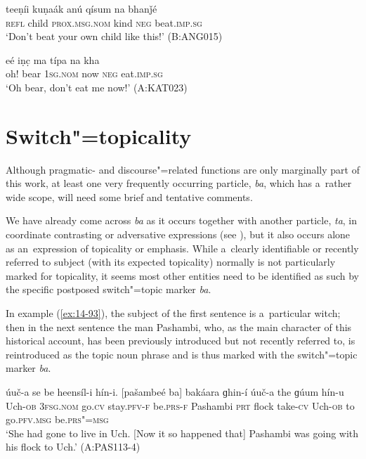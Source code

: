 \begin{exe}
\ex
\label{ex:14-91}
\gll teeṇíi kuṇaák anú qísum na bhanǰé \\
\textsc{refl} child \textsc{prox.msg.nom} kind \textsc{neg} beat.\textsc{imp.sg}  \\
\glt `Don't beat your own child like this!' (B:ANG015)

\ex
\label{ex:14-92}
\gll eé iṇc̣ ma típa na kha \\
oh! bear \textsc{1sg.nom} now \textsc{neg} eat.\textsc{imp.sg } \\
\glt `Oh bear, don't eat me now!' (A:KAT023)
\end{exe}

\section{Switch"=topicality}
\label{sec:14-4}


Although pragmatic- and discourse"=related functions are only marginally part of this work, at least one very frequently occurring particle, \textit{ba}, which has a~rather wide scope, will need some brief and tentative comments.



We have already come across \textit{ba} as it occurs together with another particle, \textit{ta}, in coordinate contrasting or adversative expressions (see ), but it also occurs alone as an~expression of topicality or emphasis. While a~clearly identifiable or recently referred to subject (with its expected topicality) normally is not particularly marked for topicality, it seems most other entities need to be identified as such by the specific postposed switch"=topic \citep[149]{andrews2007} marker \textit{ba}.



In example (\ref{ex:14-93}), the subject of the first sentence is a~particular witch; then in the next sentence the man Pashambi, who, as the main character of this historical account, has been previously introduced but not recently referred to, is reintroduced as the topic noun phrase and is thus marked with the switch"=topic marker \textit{ba}.

\begin{exe}
\ex
\label{ex:14-93}
\gll úuč-a se  be heensíl-i  hín-i. [pašambeé ba] bakáara ɡhin-í úuč-a the ɡúum hín-u \\
Uch-\textsc{ob} \textsc{3fsg.nom} go.\textsc{cv} stay.\textsc{pfv-f} be.\textsc{prs-f} Pashambi  \textsc{prt} flock take-\textsc{cv} Uch-\textsc{ob} to go.\textsc{pfv.msg} be.\textsc{prs"=msg} \\
\glt `She had gone to live in Uch. [Now it so happened that] Pashambi was going with his flock to Uch.' (A:PAS113-4)
\end{exe}

